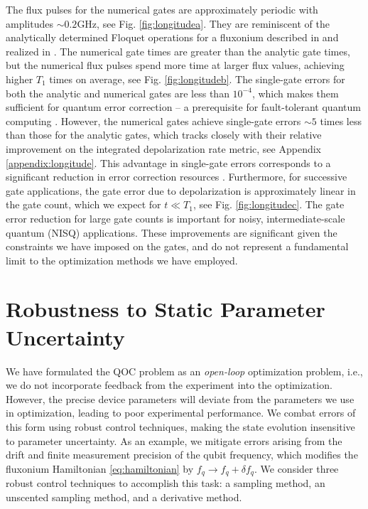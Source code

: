 \documentclass[
  amsfonts,
  amsmath,
  amssymb,
  pra,
  twocolumn,
  superscriptaddress,
]{revtex4-2}
\begin{document}
The flux pulses for the numerical gates
are approximately periodic
with amplitudes $\sim 0.2 \textrm{GHz}$, see Fig. \ref{fig:longitudea}.
They are reminiscent of the analytically determined Floquet operations
for a fluxonium described in \cite{huang2021engineering}
and realized in \cite{mundada2020floquet}.
The numerical gate times are greater
than the analytic gate times, but the
numerical flux pulses
spend more time at larger flux values, achieving higher $T_{1}$ times on average,
see Fig. \ref{fig:longitudeb}.
The single-gate errors for both the analytic and numerical gates are
less than $10^{-4}$, which makes them sufficient for quantum error correction -- a
prerequisite for fault-tolerant quantum
computing \cite{aharonov2008fault, knill2005quantum, gottesman1997stabilizer}.
However, the numerical gates achieve single-gate errors
$\sim 5$ times less than those for the analytic gates,
which tracks closely with their relative improvement
on the integrated depolarization rate metric, see Appendix \ref{appendix:longitude}.
This advantage in single-gate errors corresponds to a
significant reduction in error correction resources
\cite{paetznick2014resource, suchara2013comparing}.
Furthermore, for successive gate applications,
the gate error due to depolarization is approximately linear
in the gate count, which we expect for $t \ll T_{1}$, see Fig. \ref{fig:longitudec}.
The gate error reduction for large gate counts is
important for noisy, intermediate-scale quantum (NISQ)
applications. These improvements are significant given the constraints
we have imposed on the gates,
and do not represent a fundamental limit to the optimization
methods we have employed.

\section{Robustness to Static Parameter Uncertainty \label{sec:static}}
We have formulated the QOC
problem as an \emph{open-loop} optimization problem, i.e.,
we do not incorporate feedback from the experiment into the optimization.
However, the precise device parameters will deviate from the parameters we use in optimization,
leading to poor experimental performance. We combat errors
of this form using robust control techniques,
making the state evolution insensitive
to parameter uncertainty. As an example,
we mitigate errors arising from the drift and finite measurement
precision of the qubit frequency, which modifies the fluxonium Hamiltonian
\eqref{eq:hamiltonian} by $f_{q} \rightarrow f_{q} + \delta f_{q}$.
We consider three robust control techniques to accomplish this task:
a sampling method, an unscented sampling method,
and a derivative method.
\end{document}
